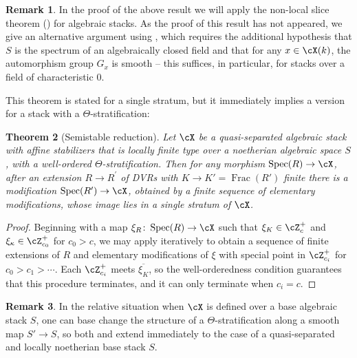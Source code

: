\documentclass[a4paper]{amsart}
\numberwithin{equation}{section}
\theoremstyle{plain}
\newtheorem{thm}{Theorem}[section]
\theoremstyle{definition}
\newtheorem{rem}[thm]{Remark}
\DeclareMathOperator{\Spec}{Spec}
\DeclareMathOperator{\Frac}{Frac}
\newcommand{\co}{\colon}
\begin{document}
\begin{rem}
In the proof of the above result we will apply the non-local slice theorem () for algebraic stacks. As the proof of this result has not appeared, we give an alternative argument using \cite[Thm.~1.2]{ahr}, which requires the additional hypothesis that $S$ is the spectrum of an algebraically closed field and that for any $x \in \cX(k)$, the automorphism group $G_x$ is smooth -- this suffices, in particular, for stacks over a field of characteristic $0$. 
\end{rem}

This theorem is stated for a single stratum, but it immediately implies a version for a stack with a $\Theta$-stratification:

\begin{thm}[Semistable reduction] \label{T:semistable_reduction}
Let $\cX$ be a quasi-separated algebraic stack with affine {stabilizers} that is locally finite type over a noetherian algebraic space $S$, with a well-ordered $\Theta$-stratification. Then for any morphism $\Spec(R) \to \cX$, after an extension $R \to R^\prime$ of DVRs with $K \to K'=\Frac(R')$ finite there is a modification $\Spec(R') \to \cX$, obtained by a finite sequence of elementary modifications, whose image lies in a single stratum of $\cX$.
\end{thm}
\begin{proof}
Beginning with a map $\xi_{R} \co \Spec(R) \to \cX$ such that $\xi_{K} \in \cZ_c^+$ and $\xi_{\kappa} \in \cZ^+_{c_0}$ for $c_0>c$, we may apply  iteratively to obtain a sequence of finite extensions of $R$ and elementary modifications of $\xi$ with special point in $\cZ^+_{c_i}$ for $c_0 > c_1 > \cdots$. Each $\cZ^+_{c_i}$ meets $\overline{\xi_{K}}$, so the well-orderedness condition guarantees that this procedure terminates, and it can only terminate when $c_i = c$.
\end{proof}

\begin{rem}
In the relative situation when $\cX$ is defined over a base algebraic stack $S$, one can base change the structure of a $\Theta$-stratification along a smooth map $S' \to S$, so both  and  extend immediately to the case of a quasi-separated and locally noetherian base stack $S$. 
\end{rem}
\end{document}
